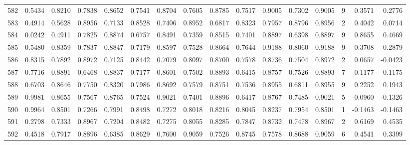 \begin{tabular}{lrrrrrrrrrrrrrrr}
582 &      0.5434 &  0.8210 &  0.7838 &  0.8652 &  0.7541 &  0.8704 &  0.7605 &  0.8785 &  0.7517 &  0.9005 &   0.7302 &     0.9005 &      9 &                    0.3571 &                     0.2776 \\
583 &      0.4914 &  0.5628 &  0.8956 &  0.7133 &  0.8528 &  0.7406 &  0.8952 &  0.6817 &  0.8323 &  0.7957 &   0.8796 &     0.8956 &      2 &                    0.4042 &                     0.0714 \\
584 &      0.0242 &  0.4911 &  0.7825 &  0.8874 &  0.6757 &  0.8491 &  0.7359 &  0.8515 &  0.7401 &  0.8897 &   0.6398 &     0.8897 &      9 &                    0.8655 &                     0.4669 \\
585 &      0.5480 &  0.8359 &  0.7837 &  0.8847 &  0.7179 &  0.8597 &  0.7528 &  0.8664 &  0.7644 &  0.9188 &   0.8060 &     0.9188 &      9 &                    0.3708 &                     0.2879 \\
586 &      0.8315 &  0.7892 &  0.8972 &  0.7125 &  0.8442 &  0.7079 &  0.8097 &  0.8700 &  0.7578 &  0.8736 &   0.7504 &     0.8972 &      2 &                    0.0657 &                    -0.0423 \\
587 &      0.7716 &  0.8891 &  0.6468 &  0.8837 &  0.7177 &  0.8601 &  0.7502 &  0.8893 &  0.6415 &  0.8757 &   0.7526 &     0.8893 &      7 &                    0.1177 &                     0.1175 \\
588 &      0.6703 &  0.8646 &  0.7750 &  0.8320 &  0.7986 &  0.8692 &  0.7579 &  0.8751 &  0.7536 &  0.8955 &   0.6811 &     0.8955 &      9 &                    0.2252 &                     0.1943 \\
589 &      0.9981 &  0.8655 &  0.7567 &  0.8765 &  0.7524 &  0.9021 &  0.7401 &  0.8896 &  0.6417 &  0.8767 &   0.7485 &     0.9021 &      5 &                   -0.0960 &                    -0.1326 \\
590 &      0.9964 &  0.8501 &  0.7266 &  0.7991 &  0.8498 &  0.7272 &  0.8018 &  0.8216 &  0.8045 &  0.8237 &   0.7954 &     0.8501 &      1 &                   -0.1463 &                    -0.1463 \\
591 &      0.2798 &  0.7333 &  0.8967 &  0.7204 &  0.8482 &  0.7275 &  0.8055 &  0.8285 &  0.7847 &  0.8732 &   0.7478 &     0.8967 &      2 &                    0.6169 &                     0.4535 \\
592 &      0.4518 &  0.7917 &  0.8896 &  0.6385 &  0.8629 &  0.7600 &  0.9059 &  0.7526 &  0.8745 &  0.7578 &   0.8688 &     0.9059 &      6 &                    0.4541 &                     0.3399 \\

\end{tabular}
